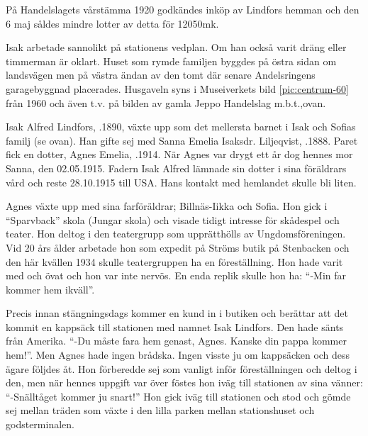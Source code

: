 På Handelslagets vårstämma 1920 godkändes inköp av Lindfors hemman och den 6 maj såldes mindre lotter av detta för 12050mk.

Isak arbetade sannolikt på stationens vedplan. Om han också varit dräng eller timmerman är oklart. Huset som rymde familjen byggdes på östra sidan om landsvägen men på västra ändan av den tomt där senare Andelsringens garagebyggnad placerades. Husgaveln syns i Museiverkets bild \ref{pic:centrum-60} från 1960 och även t.v. på bilden av gamla Jeppo Handelslag m.b.t.,ovan.
\begin{jhchildren}
  \item {}
  \item {}
  \item {}
\end{jhchildren}

Isak Alfred Lindfors, .1890,  växte upp som det mellersta barnet i Isak och Sofias familj (se ovan). Han gifte sej med Sanna Emelia Isaksdr. Liljeqvist, .1888. Paret fick en dotter, Agnes Emelia, .1914. När Agnes var drygt ett år dog hennes mor Sanna, den 02.05.1915. Fadern Isak Alfred lämnade sin dotter i sina föräldrars vård och reste 28.10.1915 till USA. Hans kontakt med hemlandet skulle bli liten.

Agnes växte upp med sina farföräldrar; Billnäs-Iikka och Sofia. Hon gick i ``Sparvback'' skola (Jungar skola) och visade tidigt intresse för skådespel och teater. Hon deltog i den teatergrupp som upprätthölls av Ungdomsföreningen. Vid 20 års ålder arbetade hon som expedit på Ströms butik på Stenbacken och den här kvällen 1934 skulle teatergruppen ha en föreställning. Hon hade varit med och övat och hon var inte nervös. En enda replik skulle hon ha: ``-Min far kommer hem ikväll''.

Precis innan stängningsdags kommer en kund in i butiken och berättar att det kommit en kappsäck till stationen med namnet Isak Lindfors. Den hade sänts från Amerika. ``-Du måste fara hem genast, Agnes. Kanske din pappa kommer hem!''.  Men Agnes hade ingen brådska. Ingen visste ju om kappsäcken och dess ägare följdes åt. Hon förberedde sej som vanligt inför föreställningen och deltog i den, men när hennes uppgift var över föstes hon iväg till stationen av sina vänner: ``-Snälltåget kommer ju snart!'' Hon gick iväg till stationen och stod och gömde sej mellan träden som växte i den lilla parken mellan stationshuset och godsterminalen.

